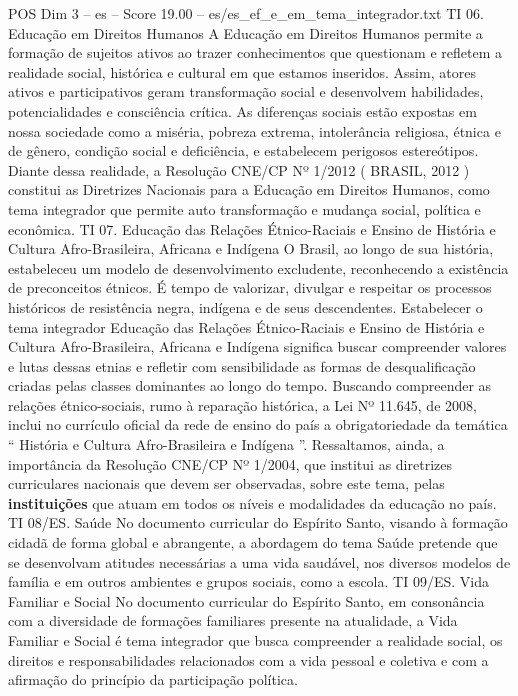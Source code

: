 \begin{textsample}{POS Dim 3 – es – Score 19.00 – es/es\_ef\_e\_em\_tema\_integrador.txt}
TI 06.
Educação em Direitos Humanos A Educação em Direitos Humanos permite a formação de sujeitos ativos ao trazer conhecimentos que questionam e refletem a realidade social, histórica e cultural em que estamos inseridos.
Assim, atores ativos e participativos geram transformação social e desenvolvem habilidades, potencialidades e consciência crítica.
As diferenças sociais estão expostas em nossa sociedade como a miséria, pobreza extrema, intolerância religiosa, étnica e de gênero, condição social e deficiência, e estabelecem perigosos estereótipos.
Diante dessa realidade, a Resolução CNE/CP Nº 1/2012 ( BRASIL, 2012 ) constitui as Diretrizes Nacionais para a Educação em Direitos Humanos, como tema integrador que permite auto transformação e mudança social, política e econômica.
TI 07.
Educação das Relações Étnico-Raciais e Ensino de História e Cultura Afro-Brasileira, Africana e Indígena O Brasil, ao longo de sua história, estabeleceu um modelo de desenvolvimento excludente, reconhecendo a existência de preconceitos étnicos.
É tempo de valorizar, divulgar e respeitar os processos históricos de resistência negra, indígena e de seus descendentes.
Estabelecer o tema integrador Educação das Relações Étnico-Raciais e Ensino de História e Cultura Afro-Brasileira, Africana e Indígena significa buscar compreender valores e lutas dessas etnias e refletir com sensibilidade as formas de desqualificação criadas pelas classes dominantes ao longo do tempo.
Buscando compreender as relações étnico-sociais, rumo à reparação histórica, a Lei Nº 11.645, de 2008, inclui no currículo oficial da rede de ensino do país a obrigatoriedade da temática “ História e Cultura Afro-Brasileira e Indígena ”.
Ressaltamos, ainda, a importância da Resolução CNE/CP Nº 1/2004, que institui as diretrizes curriculares nacionais que devem ser observadas, sobre este tema, pelas \textbf{instituições} que atuam em todos os níveis e modalidades da educação no país.
TI 08/ES.
Saúde No documento curricular do Espírito Santo, visando à formação cidadã de forma global e abrangente, a abordagem do tema Saúde pretende que se desenvolvam atitudes necessárias a uma vida saudável, nos diversos modelos de família e em outros ambientes e grupos sociais, como a escola.
TI 09/ES.
Vida Familiar e Social No documento curricular do Espírito Santo, em consonância com a diversidade de formações familiares presente na atualidade, a Vida Familiar e Social é tema integrador que busca compreender a realidade social, os direitos e responsabilidades relacionados com a vida pessoal e coletiva e com a afirmação do princípio da participação política.

\end{textsample}
